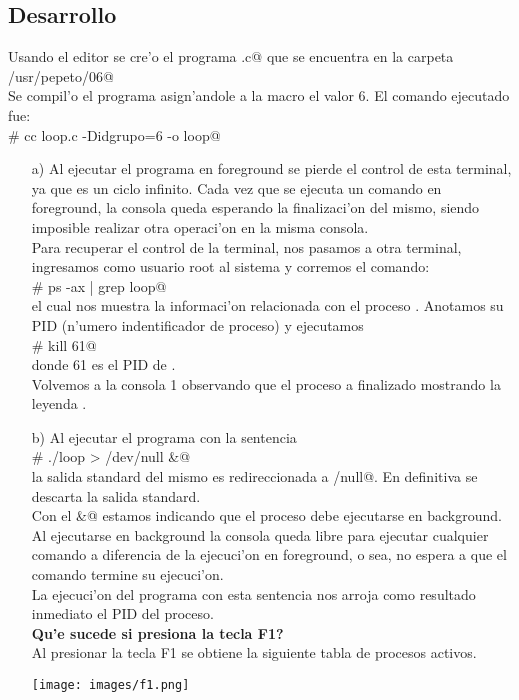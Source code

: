 \subsection{Desarrollo}
	Usando el editor \verb@vi@ se cre'o el programa \verb@loop.c@ que se encuentra en la carpeta \verb@/usr/pepeto/06@\\
	Se compil'o el programa asign'andole a la macro \verb@idgrupo@ el valor 6. El comando ejecutado fue:\\
	\verb@# cc loop.c -Didgrupo=6 -o loop@
	\begin{itemize}
	\item[a)] Al ejecutar el programa \verb@loop@ en foreground se pierde el control de esta terminal, ya que \verb@loop@ es un ciclo infinito. Cada vez que se ejecuta un comando en foreground, la consola queda esperando la finalizaci'on del mismo, siendo imposible realizar otra operaci'on en la misma consola.\\
		Para recuperar el control de la terminal, nos pasamos a otra terminal, ingresamos como usuario root al sistema y corremos el comando:\\
		 \verb@# ps -ax | grep loop@\\
		 el cual nos muestra la informaci'on relacionada con el proceso \verb@loop@. Anotamos su PID (n'umero indentificador de proceso) y ejecutamos\\
		 \verb@# kill 61@\\
		 donde 61 es el PID de \verb@loop@.\\
		Volvemos a la consola 1 observando que el proceso a finalizado mostrando la leyenda \verb@Terminated@.

	\item[b)] Al ejecutar el programa con la sentencia\\
		 \verb@# ./loop > /dev/null &@\\
		 la salida standard del mismo es redireccionada a \verb@dev/null@. En definitiva se descarta la salida standard.\\
		 Con el \verb@&@ estamos indicando que el proceso debe ejecutarse en background. Al ejecutarse en background la consola queda libre para ejecutar cualquier comando a diferencia de la ejecuci'on en foreground, o sea, no espera a que el comando termine su ejecuci'on.\\
		 La ejecuci'on del programa con esta sentencia nos arroja como resultado inmediato el PID del proceso.\\

		\textbf{Qu'e sucede si presiona la tecla F1?}\\
		Al presionar la tecla F1 se obtiene la siguiente tabla de procesos activos. 
		\begin{center}
			\texttt{[image: images/f1.png]}
		\end{center}


\end{itemize}
